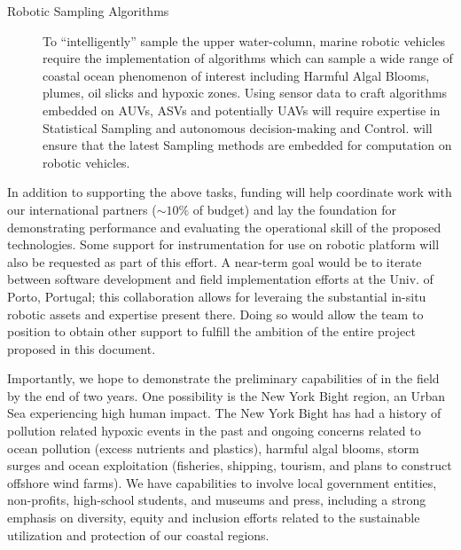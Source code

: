 \begin{description}
\item[Robotic Sampling Algorithms] To ``intelligently'' sample the upper
  water-column, marine robotic vehicles require the implementation of
  algorithms which can sample a wide range of coastal ocean phenomenon
  of interest including Harmful Algal Blooms, plumes, oil slicks and
  hypoxic zones. Using sensor data to craft algorithms embedded on AUVs,
  ASVs and potentially UAVs will require expertise in Statistical
  Sampling and autonomous decision-making and Control. \pro will ensure
  that the latest Sampling methods are embedded for computation on
  robotic vehicles.

\end{description}

\noindent
In addition to supporting the above tasks, \kck funding will help
coordinate work with our international partners ($\sim 10\%$ of
budget) and lay the foundation for demonstrating performance and
evaluating the operational skill of the proposed technologies. Some
support for instrumentation for use on robotic platform will also be
requested as part of this effort. A near-term goal would be to iterate
between software development and field implementation efforts at the
Univ. of Porto, Portugal; this collaboration allows for leveraing the
substantial in-situ robotic assets and expertise present there.  Doing
so would allow the team to position \pro to obtain other support to
fulfill the ambition of the entire project proposed in this document.

Importantly, we hope to demonstrate the preliminary capabilities of \pro in the field by the end of two years.  One possibility is the New York Bight region, an Urban Sea experiencing high human impact.  The New York Bight has had a history of pollution related hypoxic events in the past and ongoing concerns related to ocean pollution (excess nutrients and plastics), harmful algal blooms, storm surges and ocean
exploitation (fisheries, shipping, tourism, and plans to construct offshore wind farms). We have
capabilities to involve local government entities, non-profits,
high-school students, and museums and press, including a strong
emphasis on diversity, equity and inclusion efforts related to the
sustainable utilization and protection of our coastal regions.


